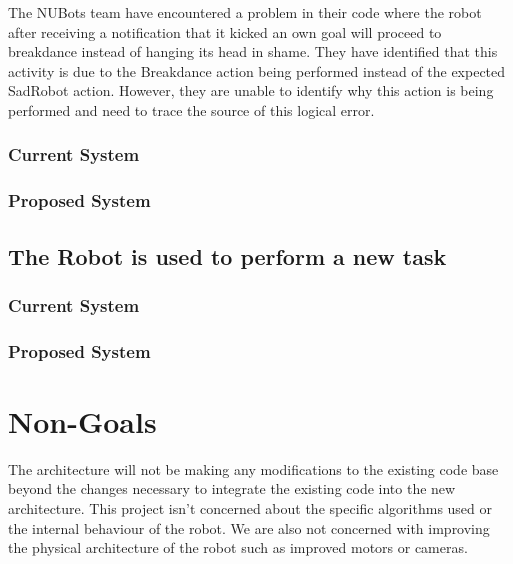 \documentclass[english,12pt]{scrartcl}
\begin{document}
			The NUBots team have encountered a problem in their code where the robot after
			receiving a notification that it kicked an own goal will proceed to breakdance instead
			of hanging its head in shame. They have identified that this activity is due to the
			Breakdance action being performed instead of the expected SadRobot action. However, they
			are unable to identify why this action is being performed and need to trace the source
			of this logical error.
    
            \subsubsection{Current System}
            \subsubsection{Proposed System}
            
        \subsection{The Robot is used to perform a new task}
    
            \subsubsection{Current System}
            \subsubsection{Proposed System}
        
    \section{Non-Goals}
        The architecture will not be making any modifications to the existing code base beyond the
        changes necessary to integrate the existing code into the new architecture. This project
        isn't concerned about the specific algorithms used or the internal behaviour of the robot.
        We are also not concerned with improving the physical architecture of the robot such as
        improved motors or cameras.
    
\end{document}
